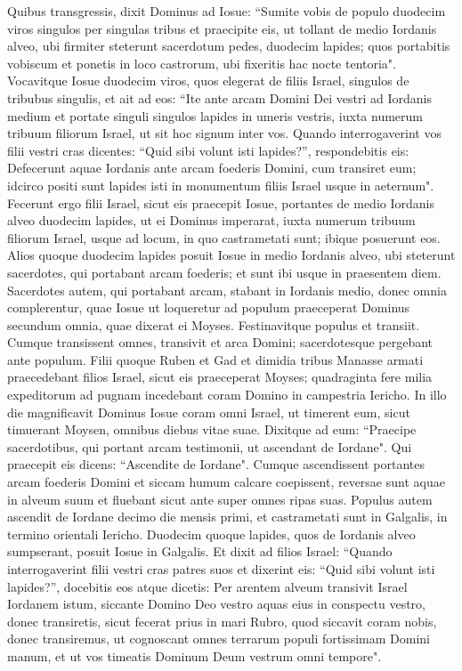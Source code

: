 \begin{biblechapter}  
\verse Quibus transgressis, dixit Dominus ad Iosue: 
\verse “Sumite vobis de populo duodecim viros singulos per singulas tribus 
\verse et praecipite eis, ut tollant de medio Iordanis alveo, ubi firmiter steterunt sacerdotum pedes, duodecim lapides; quos portabitis vobiscum et ponetis in loco castrorum, ubi fixeritis hac nocte tentoria". 
\verse Vocavitque Iosue duodecim viros, quos elegerat de filiis Israel, singulos de tribubus singulis, 
\verse et ait ad eos: “Ite ante arcam Domini Dei vestri ad Iordanis medium et portate singuli singulos lapides in umeris vestris, iuxta numerum tribuum filiorum Israel, 
\verse ut sit hoc signum inter vos. Quando interrogaverint vos filii vestri cras dicentes: “Quid sibi volunt isti lapides?”, 
\verse respondebitis eis: Defecerunt aquae Iordanis ante arcam foederis Domini, cum transiret eum; idcirco positi sunt lapides isti in monumentum filiis Israel usque in aeternum". 
\verse Fecerunt ergo filii Israel, sicut eis praecepit Iosue, portantes de medio Iordanis alveo duodecim lapides, ut ei Dominus imperarat, iuxta numerum tribuum filiorum Israel, usque ad locum, in quo castrametati sunt; ibique posuerunt eos. 
\verse Alios quoque duodecim lapides posuit Iosue in medio Iordanis alveo, ubi steterunt sacerdotes, qui portabant arcam foederis; et sunt ibi usque in praesentem diem. 
\verse Sacerdotes autem, qui portabant arcam, stabant in Iordanis medio, donec omnia complerentur, quae Iosue ut loqueretur ad populum praeceperat Dominus secundum omnia, quae dixerat ei Moyses. Festinavitque populus et transiit. 
\verse Cumque transissent omnes, transivit et arca Domini; sacerdotesque pergebant ante populum. 
\verse Filii quoque Ruben et Gad et dimidia tribus Manasse armati praecedebant filios Israel, sicut eis praeceperat Moyses; 
\verse quadraginta fere milia expeditorum ad pugnam incedebant coram Domino in campestria Iericho. 
\verse In illo die magnificavit Dominus Iosue coram omni Israel, ut timerent eum, sicut timuerant Moysen, omnibus diebus vitae suae. 
\verse Dixitque ad eum:  
\verse “Praecipe sacerdotibus, qui portant arcam testimonii, ut ascendant de Iordane". 
\verse Qui praecepit eis dicens: “Ascendite de Iordane". 
\verse Cumque ascendissent portantes arcam foederis Domini et siccam humum calcare coepissent, reversae sunt aquae in alveum suum et fluebant sicut ante super omnes ripas suas. 
\verse Populus autem ascendit de Iordane decimo die mensis primi, et castrametati sunt in Galgalis, in termino orientali Iericho. 
\verse Duodecim quoque lapides, quos de Iordanis alveo sumpserant, posuit Iosue in Galgalis. 
\verse Et dixit ad filios Israel: “Quando interrogaverint filii vestri cras patres suos et dixerint eis: “Quid sibi volunt isti lapides?”, 
\verse docebitis eos atque dicetis: Per arentem alveum transivit Israel Iordanem istum, 
\verse siccante Domino Deo vestro aquas eius in conspectu vestro, donec transiretis, 
\verse sicut fecerat prius in mari Rubro, quod siccavit coram nobis, donec transiremus,  
\verse ut cognoscant omnes terrarum populi fortissimam Domini manum, et ut vos timeatis Dominum Deum vestrum omni tempore". 
\end{biblechapter}

